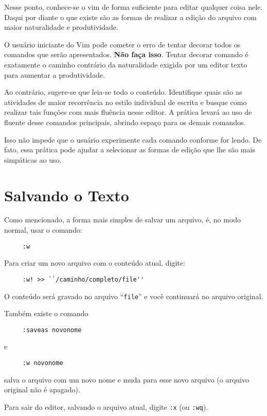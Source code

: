 Nesse ponto, conhece-se o vim de forma suficiente para editar
qualquer coisa nele. Daqui por diante o que existe são as formas de
realizar a edição do arquivo com maior naturalidade e produtividade.

O usuário iniciante do Vim pode cometer o erro de tentar decorar 
todos os comandos que serão apresentados. {\bf Não faça isso}. Tentar decorar
comando é exatamente o caminho contrário da naturalidade exigida por 
um editor texto para aumentar a produtividade.

Ao contrário, sugere-se que leia-se todo o conteúdo. Identifique 
quais são as atividades de maior recorrência no estilo individual de 
escrita e busque como realizar tais funções com mais fluência nesse
editor. A prática levará ao uso de fluente desse comandos principais,
abrindo espaço para os demais comandos.

Isso não impede que o usuário experimente cada comando conforme for lendo.
De fato, essa prática pode ajudar a selecionar as formas de edição que lhe
são mais simpáticas ao uso.

\section{Salvando o Texto}
\label{sec:Salvando}

Como mencionado, a forma mais simples de salvar um arquivo, é, 
no modo normal, usar o comando:
\begin{verbatim}
     :w
\end{verbatim}

Para criar um novo arquivo com o conteúdo atual, digite:
\begin{verbatim}
     :w! >> ``/caminho/completo/file''
\end{verbatim}
O conteúdo será gravado no arquivo ``{\tt file}'' e você continuará no
 arquivo original.

Também existe o comando

\begin{verbatim}
     :saveas novonome
\end{verbatim}

e

\begin{verbatim}
     :w novonome
\end{verbatim}
salva o arquivo com um novo nome e muda para esse novo arquivo (o arquivo
original não é apagado). 

Para sair do editor, salvando o arquivo atual, digite {\tt :x} (ou {\tt :wq}).

